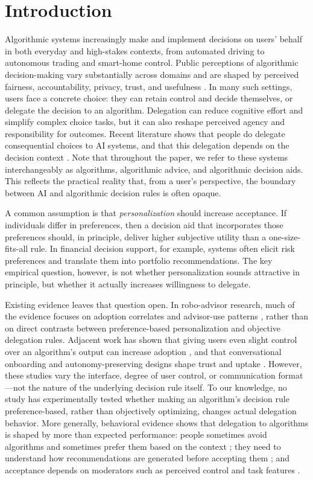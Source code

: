 \documentclass[a4paper, 12pt, fleqn]{article}
\theoremstyle{definition}
\begin{document}
\section{Introduction}\label{sec:intro}
Algorithmic systems increasingly make and implement decisions on users’ behalf in both everyday and high-stakes contexts, from automated driving %
to autonomous trading and smart-home control. Public perceptions of algorithmic decision-making vary substantially across domains and are shaped by perceived fairness, accountability, privacy, trust, and usefulness \citep{Aysolmaz2023}. In many such settings, users face a concrete choice: they can retain control and decide themselves, or delegate the decision to an algorithm. Delegation can reduce cognitive effort and simplify complex choice tasks, but it can also reshape perceived agency and responsibility for outcomes. Recent literature shows that people do delegate consequential choices to AI systems, and that this delegation depends on the decision context \citep{Candrian2022}. Note that throughout the paper, we refer to these systems interchangeably as algorithms, algorithmic advice, and algorithmic decision aids. This reflects the practical reality that, from a user's perspective, the boundary between AI and algorithmic decision rules is often opaque.

A common assumption is that \emph{personalization} should increase acceptance. If individuals differ in preferences, then a decision aid that incorporates those preferences should, in principle, deliver higher subjective utility than a one-size-fits-all rule. In financial decision support, for example, systems often elicit risk preferences and translate them into portfolio recommendations. The key empirical question, however, is not whether personalization sounds attractive in principle, but whether it actually increases willingness to delegate.

Existing evidence leaves that question open. In robo-advisor research, much of the evidence focuses on adoption correlates and advisor-use patterns \citep[for example,][]{Mahmud2025}, rather than on direct contrasts between preference-based personalization and objective delegation rules. Adjacent work has shown that giving users even slight control over an algorithm's output can increase adoption \citep{Dietvorst2018}, and that conversational onboarding and autonomy-preserving designs shape trust and uptake \citep{Hildebrand2021,Fink2024}. However, these studies vary the interface, degree of user control, or communication format---not the nature of the underlying decision rule itself. To our knowledge, no study has experimentally tested whether making an algorithm's decision rule preference-based, rather than objectively optimizing, changes actual delegation behavior. More generally, behavioral evidence shows that delegation to algorithms is shaped by more than expected performance: people sometimes avoid algorithms and sometimes prefer them based on the context \citep{Dietvorst2018,Logg2019}; they need to understand how recommendations are generated before accepting them \citep{Yeomans2019}; and acceptance depends on moderators such as perceived control and task features \citep{Mahmud2022,Chugunova2022}.
\end{document}
